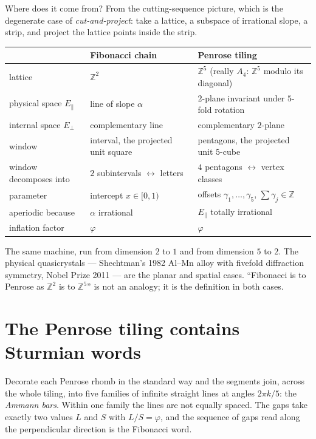 \documentclass[11pt,a4paper]{article}
\newcommand{\Z}{\mathbb{Z}}
\theoremstyle{definition}
\theoremstyle{plain}
\begin{document}
Where does it come from? From the cutting-sequence picture, which is the
degenerate case of \emph{cut-and-project}: take a lattice, a subspace of
irrational slope, a strip, and project the lattice points inside the strip.

\begin{center}\small
\begin{tabular}{lll}
\toprule
 & Fibonacci chain & Penrose tiling \\
\midrule
lattice & $\Z^2$ & $\Z^5$ (really $A_4$: $\Z^5$ modulo its diagonal) \\
physical space $E_\parallel$ & line of slope $\alpha$ & $2$-plane invariant under $5$-fold rotation \\
internal space $E_\perp$ & complementary line & complementary $2$-plane \\
window & interval, the projected unit square & pentagons, the projected unit $5$-cube \\
window decomposes into & $2$ subintervals $\leftrightarrow$ letters & $4$ pentagons $\leftrightarrow$ vertex classes \\
parameter & intercept $x \in [0,1)$ & offsets $\gamma_1,\dots,\gamma_5$, $\sum \gamma_j \in \Z$ \\
aperiodic because & $\alpha$ irrational & $E_\parallel$ totally irrational \\
inflation factor & $\varphi$ & $\varphi$ \\
\bottomrule
\end{tabular}
\end{center}

The same machine, run from dimension $2$ to $1$ and from dimension $5$ to $2$.
The physical quasicrystals --- Shechtman's 1982 Al--Mn alloy with fivefold
diffraction symmetry, Nobel Prize 2011 --- are the planar and spatial cases.
``Fibonacci is to Penrose as $\Z^2$ is to $\Z^5$'' is not an analogy; it is the
definition in both cases.

\section{The Penrose tiling contains Sturmian words}

Decorate each Penrose rhomb in the standard way and the segments join, across
the whole tiling, into five families of infinite straight lines at angles
$2\pi k/5$: the \emph{Ammann bars}. Within one family the lines are not equally
spaced. The gaps take exactly two values $L$ and $S$ with $L/S = \varphi$, and
the sequence of gaps read along the perpendicular direction is the Fibonacci
word.
\end{document}
